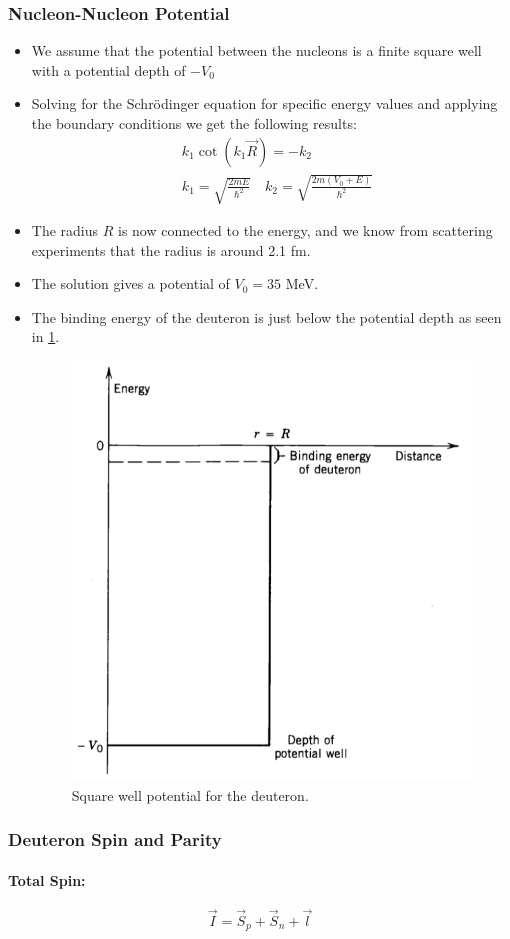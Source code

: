 \documentclass{article}
\begin{document}
\subsubsection{Nucleon-Nucleon Potential}
\begin{itemize}
    \item We assume that the potential between the nucleons is a finite square well with a potential depth of $-V_0$
    \item Solving for the Schrödinger equation for specific energy values and applying the boundary conditions we get the following results:
    \begin{align}
    &k_1 \cot \left(k_1 \vec{R}\right) = -k_2 \\
    &k_1 = \sqrt{\frac{2mE}{\hbar^2}} \quad k_2 = \sqrt{\frac{2m\left(V_0 + E\right)}{\hbar^2}}
    \end{align}
    \item The radius $R$ is now connected to the energy, and we know from scattering experiments that the radius is around 2.1 fm.
    \item The solution gives a potential of $V_0 = 35$ MeV. 
    \item The binding energy of the deuteron is just below the potential depth as seen in \cref{fig: deuteron_potential}.
    \begin{figure}[h!]
    \centering
    \includegraphics[width = .5\textwidth]{deuteron_potential.png}
    \caption{Square well potential for the deuteron. }
    \label{fig: deuteron_potential}
    \end{figure}
\end{itemize}

\subsubsection{Deuteron Spin and Parity}
\paragraph{Total Spin:}
\begin{equation}
  \vec{I} = \vec{S}_p + \vec{S}_n + \vec{l}
\end{equation}
\end{document}
